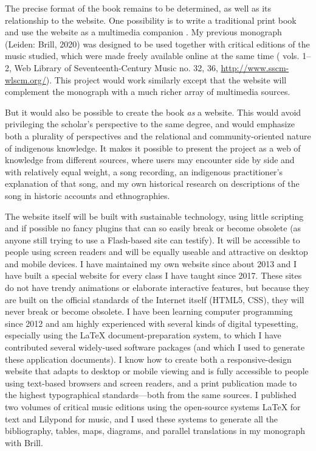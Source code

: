 \documentclass{neh}
\begin{document}

The precise format of the book remains to be determined, as well as its
relationship to the website.
One possibility is to write a traditional print book and use the website as a
multimedia companion 
\autocite[as in]{Eyerly:Moravian}.
My previous monograph  (Leiden: Brill, 2020) was
designed to be used together with critical editions of the music
studied, which were made freely available online at the same time
( vols. 1--2, Web Library of
Seventeenth-Century Music no. 32, 36, \url{http://www.sscm-wlscm.org/}).
This project would work similarly except that the website will complement the
monograph with a much richer array of multimedia sources.

But it would also be possible to create the book \emph{as} a website. 
This would avoid privileging the scholar's perspective to the same degree, and
would emphasize both a plurality of perspectives and the relational and
community-oriented nature of indigenous knowledge.
It makes it possible to present the project as a web of knowledge from
different sources, where users may encounter side by side and with relatively
equal weight, a song recording, an indigenous practitioner's explanation of
that song, and my own historical research on descriptions of the song in
historic accounts and ethnographies. 

The website itself will be built with sustainable technology, using little
scripting and if possible no fancy plugins that can so easily break or become
obsolete (as anyone still trying to use a Flash-based site can testify).
It will be accessible to people using screen readers and will be equally
useable and attractive on desktop and mobile devices.
I have maintained my own website since about 2013 and I have built a special
website for every class I have taught since 2017.
These sites do not have trendy animations or elaborate interactive features,
but because they are built on the official standards of the Internet itself
(HTML5, CSS), they will never break or become obsolete.
I have been learning computer programming since 2012 and am highly experienced
with several kinds of digital typesetting, especially using the \LaTeX{}
document-preparation system, to which I have contributed several widely-used
software packages (and which I used to generate these application documents).
I know how to create both a responsive-design website that adapts to desktop
or mobile viewing and is fully accessible to people using text-based browsers
and screen readers, and a print publication made to the highest typographical
standards---both from the same sources.
I published two volumes of critical music editions using the open-source
systems \LaTeX{} for text and Lilypond for music, and I used these systems to
generate all the bibliography, tables, maps, diagrams, and parallel
translations in my monograph with Brill.
\end{document}
